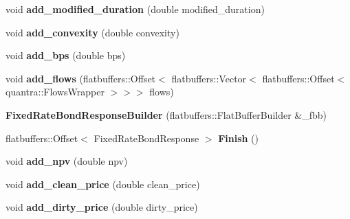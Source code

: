 \begin{DoxyCompactItemize}
void {\bfseries add\+\_\+modified\+\_\+duration} (double modified\+\_\+duration)
\item 
\mbox{\label{structquantra_1_1FixedRateBondResponseBuilder_a06475e4a933d653bbfcec17eab0ef7ad}} 
void {\bfseries add\+\_\+convexity} (double convexity)
\item 
\mbox{\label{structquantra_1_1FixedRateBondResponseBuilder_a9835cc69e13ffbab509db118c2d383ac}} 
void {\bfseries add\+\_\+bps} (double bps)
\item 
\mbox{\label{structquantra_1_1FixedRateBondResponseBuilder_a20ff7251a9c41fbbc05b3fa4770c1682}} 
void {\bfseries add\+\_\+flows} (flatbuffers\+::\+Offset$<$ flatbuffers\+::\+Vector$<$ flatbuffers\+::\+Offset$<$ quantra\+::\+Flows\+Wrapper $>$$>$$>$ flows)
\item 
\mbox{\label{structquantra_1_1FixedRateBondResponseBuilder_a0c6b61947b183f68ec0fb65453f47edd}} 
{\bfseries Fixed\+Rate\+Bond\+Response\+Builder} (flatbuffers\+::\+Flat\+Buffer\+Builder \&\+\_\+fbb)
\item 
\mbox{\label{structquantra_1_1FixedRateBondResponseBuilder_a7ea1076cb7eb9be4affd1354dee89e91}} 
flatbuffers\+::\+Offset$<$ Fixed\+Rate\+Bond\+Response $>$ {\bfseries Finish} ()
\item 
\mbox{\label{structquantra_1_1FixedRateBondResponseBuilder_a99320927862d6f204f37d5b95c64f9c2}} 
void {\bfseries add\+\_\+npv} (double npv)
\item 
\mbox{\label{structquantra_1_1FixedRateBondResponseBuilder_a2e2d9376f4a0330d83bea620817e7221}} 
void {\bfseries add\+\_\+clean\+\_\+price} (double clean\+\_\+price)
\item 
\mbox{\label{structquantra_1_1FixedRateBondResponseBuilder_a0b73a7ec559087f4bd63502fffbaa9bb}} 
void {\bfseries add\+\_\+dirty\+\_\+price} (double dirty\+\_\+price)
\item 

\end{DoxyCompactItemize}
